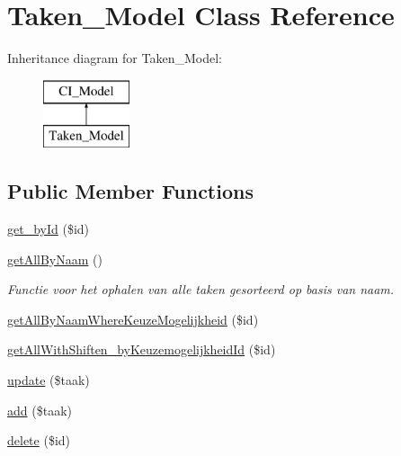 \hypertarget{class_taken___model}{}\section{Taken\+\_\+\+Model Class Reference}
\label{class_taken___model}
Inheritance diagram for Taken\+\_\+\+Model\+:\begin{figure}[H]
\begin{center}
\leavevmode
\includegraphics[height=2.000000cm]{class_taken___model}
\end{center}
\end{figure}
\subsection*{Public Member Functions}
\begin{DoxyCompactItemize}
\item 
\mbox{\hyperlink{class_taken___model_ab8c238bca4fc5170294717b94c875cc3}{get\+\_\+by\+Id}} (\$id)
\item 
\mbox{\label{class_taken___model_a5e53ebfe17a0adb72cccb12728f83d6a}} 
\mbox{\hyperlink{class_taken___model_a5e53ebfe17a0adb72cccb12728f83d6a}{get\+All\+By\+Naam}} ()
\begin{DoxyCompactList}\small\item\em Functie voor het ophalen van alle taken gesorteerd op basis van naam. \end{DoxyCompactList}\item 
\mbox{\hyperlink{class_taken___model_aee432ed4b391407df1bf5d8c4973e5fa}{get\+All\+By\+Naam\+Where\+Keuze\+Mogelijkheid}} (\$id)
\item 
\mbox{\hyperlink{class_taken___model_a1b4e18ac99960b20467b3b3cbaa817b4}{get\+All\+With\+Shiften\+\_\+by\+Keuzemogelijkheid\+Id}} (\$id)
\item 
\mbox{\hyperlink{class_taken___model_ab4e93ac196a1aeb83582faa332619c86}{update}} (\$taak)
\item 
\mbox{\hyperlink{class_taken___model_a4ef6e4ab1c71556c29cdc6549e8c888b}{add}} (\$taak)
\item 
\mbox{\hyperlink{class_taken___model_ab00c14e7a0a268dc3f708b45f3bd172b}{delete}} (\$id)
\end{DoxyCompactItemize}


